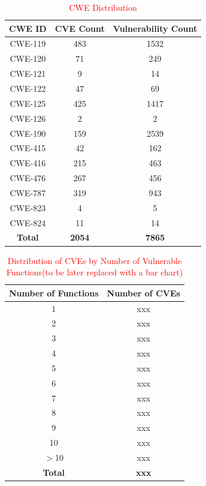 \begin{table}[H]
\centering

\begin{tabular}{c|c|c}
\hline
\textbf{CWE ID} & \textbf{CVE Count} & \textbf{Vulnerability Count} \\
\hline
CWE-119 & 483 & 1532 \\
CWE-120 & 71 & 249 \\
CWE-121 & 9 & 14 \\
CWE-122 & 47 & 69 \\
CWE-125 & 425 & 1417 \\
CWE-126 & 2 & 2 \\
CWE-190 & 159 & 2539 \\
CWE-415 & 42 & 162 \\
CWE-416 & 215 & 463 \\
CWE-476 & 267 & 456 \\
CWE-787 & 319 & 943 \\
CWE-823 & 4 & 5 \\
CWE-824 & 11 & 14 \\
\hline
\textbf{Total} & \textbf{2054} & \textbf{7865} \\
\hline
\end{tabular}
\caption{\textcolor{red}{CWE Distribution}}
\label{tab:cwe-distribution}
\end{table}

\begin{table}[h]
\centering
\begin{tabular}{c|c}
\hline
\textbf{Number of Functions} & \textbf{Number of CVEs} \\
\hline
1  & xxx \\
2  & xxx \\
3  & xxx \\
4  & xxx \\
5  & xxx \\
6  & xxx \\
7  & xxx \\
8  & xxx \\
9  & xxx \\
10 & xxx \\
$>$10 & xxx \\
\hline
\textbf{Total} & \textbf{xxx} \\
\hline
\end{tabular}
\caption{\textcolor{red}{Distribution of CVEs by Number of Vulnerable Functions(to be later replaced with a bar chart)}}
\label{tab:cve-func-dist}
\end{table}

